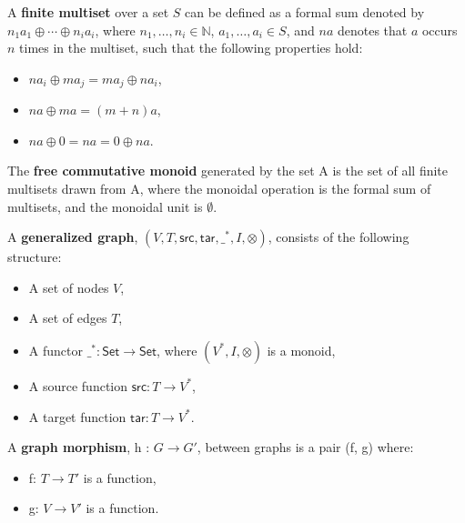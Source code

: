 
\begin{definition}
  \label{def:Finite-Multiset}
  A \textbf{finite multiset} over a set $S$ can be defined as a formal
  sum denoted by $n_1a_1 \oplus \cdots \oplus n_ia_i$, where $n_1,
  \ldots, n_i \in \mathbb{N}$, $a_1, \ldots, a_i \in S$, and $na$
  denotes that $a$ occurs $n$ times in the multiset, such that the
  following properties hold:
  \begin{itemize}    
  \item $na_i \oplus ma_j = ma_j \oplus na_i$,
  \item $na \oplus ma = (m+n)a$,
  \item $na \oplus 0 = na = 0 \oplus na$.
  \end{itemize}
\end{definition}
%
\begin{definition}
  \label{def:Free-Commutative-Monoid}  
  The \textbf{free commutative monoid} generated by the set A is the
  set of all finite multisets drawn from A, where the monoidal
  operation is the formal sum of multisets, and the monoidal unit is
  $\emptyset$.
\end{definition}
%
\begin{definition}
  \label{def:Graph}
  A \textbf{generalized graph}, $(V, T, \mathsf{src}, \mathsf{tar}, \_^*,I,\otimes)$, consists of the following structure:  %
  \begin{itemize}
  \item A set of nodes $V$,
  \item A set of edges $T$,
  \item A functor $\_^* : \mathsf{Set} \to \mathsf{Set}$, where
    $(V^*,I,\otimes)$ is a monoid,
  \item A source function $\mathsf{src} : T \to V^*$,
  \item A target function $\mathsf{tar} : T \to V^*$.
  \end{itemize}
\end{definition}
%
\begin{definition}
  \label{def:Graph-Morphism}
  A \textbf{graph morphism}, h : $G \to G'$, between graphs is a pair (f, g) where:
  \begin{itemize}
  \item f: $T \to T'$ is a function,
  \item g: $V \to V'$ is a function.
  \end{itemize}
\end{definition}


